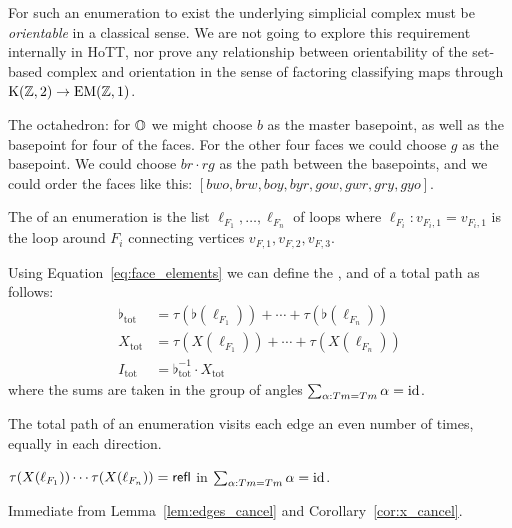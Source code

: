\begin{mynote}
For such an enumeration to exist the underlying simplicial complex must be \emph{orientable} in a classical sense. We are not going to explore this requirement internally in HoTT, nor prove any relationship between orientability of the set-based complex and orientation in the sense of factoring classifying maps through \( \mathrm{K}(\mathbb{Z},2)\to\mathrm{EM}(\mathbb{Z},1) \).
\end{mynote}

\begin{myex}
The octahedron: for \( \mathbb{O} \) we might choose \( b \) as the master basepoint, as well as the basepoint for four of the faces. For the other four faces we could choose \( g \) as the basepoint. We could choose \( br\cdot rg \) as the path between the basepoints, and we could order the faces like this: \( [bwo, brw, boy, byr, gow, gwr, gry, gyo] \).
\end{myex}

\begin{mydef}
The  of an enumeration is the list \( \ell_{F_1},\ldots,\ell_{F_n} \) of loops where \( \ell_{F_i}:v_{F_i,1}=v_{F_i,1} \) is the loop around \( F_i \) connecting vertices \( v_{F,1}, v_{F,2}, v_{F,3} \).
\end{mydef}

\begin{mydef}
Using Equation~\ref{eq:face_elements} we can define the ,  and  of a total path as follows:
\begin{equation}
\label{eq:total_elements}
\begin{aligned}
\flat_\mathrm{tot}&=\tau(\flat(\ell_{F_1}))+\cdots+\tau(\flat(\ell_{F_n}))\\
X_\mathrm{tot}&=\tau(X(\ell_{F_1}))+\cdots+\tau(X(\ell_{F_n}))\\
I_\mathrm{tot}&=\flat_\mathrm{tot}^{-1}\cdot X_\mathrm{tot}
\end{aligned}
\end{equation}
where the sums are taken in the group of angles \( \sum_{\alpha:Tm=Tm}\alpha=\text{id} \).
\end{mydef}

\begin{mylemma}
\label{lem:edges_cancel}
The total path of an enumeration visits each edge an even number of times, equally in each direction.
\end{mylemma}

\begin{mythm}
\( \tau(X(\ell_{F_1}))\cdots\tau(X(\ell_{F_n}))=\mathsf{refl} \) in \( \sum_{\alpha:Tm=Tm}\alpha=\text{id} \). 
\end{mythm}
\begin{myproof}
Immediate from Lemma~\ref{lem:edges_cancel} and Corollary~\ref{cor:x_cancel}.
\end{myproof}

